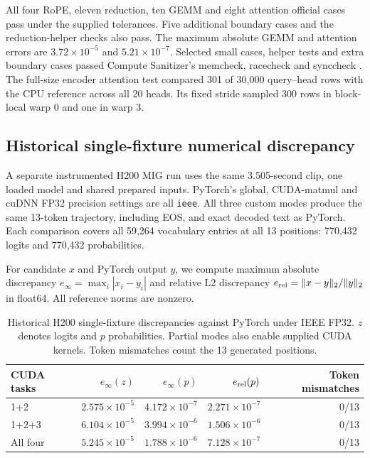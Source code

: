 \documentclass{article}
\begin{document}
All four RoPE, eleven reduction, ten GEMM and eight attention official cases pass under the supplied tolerances. Five additional boundary cases and the reduction-helper checks also pass. The maximum absolute GEMM and attention errors are $3.72\times10^{-5}$ and $5.21\times10^{-7}$. Selected small cases, helper tests and extra boundary cases passed Compute Sanitizer's memcheck, racecheck and synccheck \citep{nvidia2025}. The full-size encoder attention test compared 301 of 30,000 query--head rows with the CPU reference across all 20 heads. Its fixed stride sampled 300 rows in block-local warp 0 and one in warp 3.

\subsection{Historical single-fixture numerical discrepancy}
A separate instrumented H200 MIG run uses the same 3.505-second clip, one loaded model and shared prepared inputs. PyTorch's global, CUDA-matmul and cuDNN FP32 precision settings are all \texttt{ieee}. All three custom modes produce the same 13-token trajectory, including EOS, and exact decoded text as PyTorch. Each comparison covers all 59,264 vocabulary entries at all 13 positions: 770,432 logits and 770,432 probabilities.

For candidate $x$ and PyTorch output $y$, we compute maximum absolute discrepancy $e_\infty=\max_i|x_i-y_i|$ and relative L2 discrepancy $e_{\rm rel}=\|x-y\|_2/\|y\|_2$ in float64. All reference norms are nonzero.

\begin{table}[h]
\centering
\caption{Historical H200 single-fixture discrepancies against PyTorch under IEEE FP32. $z$ denotes logits and $p$ probabilities. Partial modes also enable supplied CUDA kernels. Token mismatches count the 13 generated positions.}
\label{tab:asr-error}
\begin{tabular}{lrrrr}
\toprule
CUDA tasks & $e_\infty(z)$ & $e_\infty(p)$ & $e_{\rm rel}(p)$ & Token mismatches\\
\midrule
1+2 & $2.575\times10^{-5}$ & $4.172\times10^{-7}$ & $2.271\times10^{-7}$ & 0/13\\
1+2+3 & $6.104\times10^{-5}$ & $3.994\times10^{-6}$ & $1.506\times10^{-6}$ & 0/13\\
All four & $5.245\times10^{-5}$ & $1.788\times10^{-6}$ & $7.128\times10^{-7}$ & 0/13\\
\bottomrule
\end{tabular}
\end{table}
\end{document}

